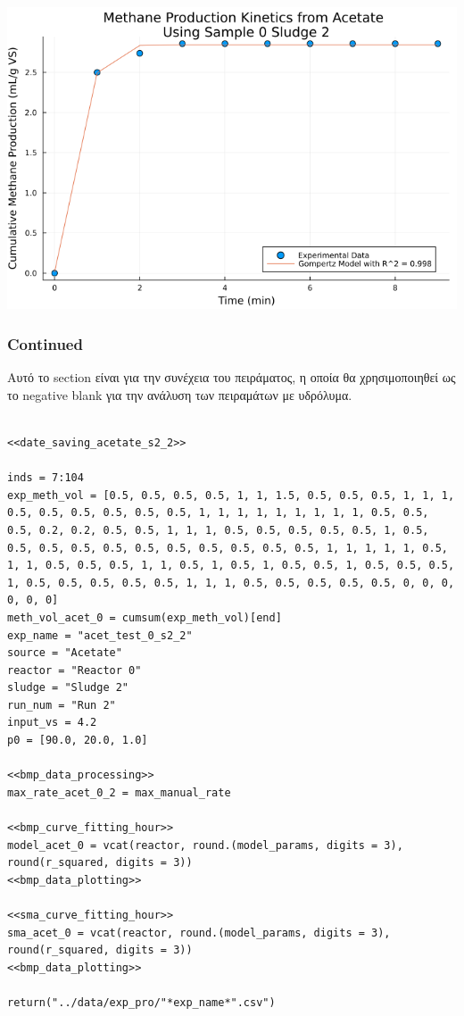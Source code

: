 \documentclass[11pt]{article}
\begin{document}
\begin{center}
\includegraphics[width=.9\linewidth]{../plots/BMPs/Acetate/specific_methane_kinetics_acet_test_0_s2.png}
\end{center}

\subsubsection{Continued}
\label{sec:org056a37d}
Αυτό το section είναι για την συνέχεια του πειράματος, η οποία θα χρησιμοποιηθεί ως το negative blank για την ανάλυση των πειραμάτων με υδρόλυμα.

\begin{verbatim}

<<date_saving_acetate_s2_2>>

inds = 7:104
exp_meth_vol = [0.5, 0.5, 0.5, 0.5, 1, 1, 1.5, 0.5, 0.5, 0.5, 1, 1, 1, 0.5, 0.5, 0.5, 0.5, 0.5, 0.5, 1, 1, 1, 1, 1, 1, 1, 1, 1, 0.5, 0.5, 0.5, 0.2, 0.2, 0.5, 0.5, 1, 1, 1, 0.5, 0.5, 0.5, 0.5, 0.5, 1, 0.5, 0.5, 0.5, 0.5, 0.5, 0.5, 0.5, 0.5, 0.5, 0.5, 0.5, 1, 1, 1, 1, 1, 0.5, 1, 1, 0.5, 0.5, 0.5, 1, 1, 0.5, 1, 0.5, 1, 0.5, 0.5, 1, 0.5, 0.5, 0.5, 1, 0.5, 0.5, 0.5, 0.5, 0.5, 1, 1, 1, 0.5, 0.5, 0.5, 0.5, 0.5, 0, 0, 0, 0, 0, 0]
meth_vol_acet_0 = cumsum(exp_meth_vol)[end]
exp_name = "acet_test_0_s2_2"
source = "Acetate"
reactor = "Reactor 0"
sludge = "Sludge 2"
run_num = "Run 2"
input_vs = 4.2
p0 = [90.0, 20.0, 1.0]

<<bmp_data_processing>>
max_rate_acet_0_2 = max_manual_rate

<<bmp_curve_fitting_hour>>
model_acet_0 = vcat(reactor, round.(model_params, digits = 3), round(r_squared, digits = 3))
<<bmp_data_plotting>>

<<sma_curve_fitting_hour>>
sma_acet_0 = vcat(reactor, round.(model_params, digits = 3), round(r_squared, digits = 3))  
<<bmp_data_plotting>>

return("../data/exp_pro/"*exp_name*".csv")

\end{verbatim}
\end{document}
